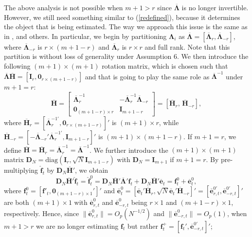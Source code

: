 \documentclass[12pt,fleqn]{article}
\def\*#1{\mathbf{#1}}
\def\+#1{\boldsymbol{#1}}
\begin{document}
The above analysis is not possible when $m +1> r$ since $\overline{\+{\Lambda}}$ is no longer invertible. However, we still need something similar to (\ref{redefined}), because it determines the object that is being estimated. The way we approach this issue is the same as in \citet{juodis2021robustness}, and others. In particular, we begin by partitioning $\+{\Lambda}_i$ as $\overline{\+{\Lambda}}=[\overline{\+{\Lambda}}_r, \overline{\+{\Lambda}}_{-r}]$, where $\overline{\+{\Lambda}}_{-r}$ is $r\times (m+1-r)$ and $\overline{\+{\Lambda}}_r$ is $r \times r$ and full rank. Note that this partition is without loss of generality under Assumption 6. We then introduce the following $(m+1)\times (m+1)$ rotation matrix, which is chosen such that $\overline{\+{\Lambda}}\overline{\*{H}}= [\*{I}_r, \*{0}_{r\times (m+1-r)}]$ and that is going to play the same role as $\overline{\+{\Lambda}}^{-1}$ under $m+1=r$:
\begin{equation}
    \overline{\*{H}} =\left[\begin{array}{cc}\overline{\+{\Lambda}}_r^{-1} & -\overline{\+{\Lambda}}_r^{-1}\overline{\+{\Lambda}}_{-r}\\
    \*{0}_{(m+1-r)\times r} & \*{I}_{m+1-r}\end{array}\right]=[\overline{\*{H}}_r,\, \overline{\*{H}}_{-r}],
\end{equation}
where $\overline{\*{H}}_r=[\overline{\+{\Lambda}}_r^{-1\prime}, \*{0}_{r\times (m+1-r)} ]'$ is $(m+1)\times r$, while $\overline{\*{H}}_{-r}=[ -\overline{\+{\Lambda}}_{-r}'\overline{\+{\Lambda}}_r^{-1\prime}, \*{I}_{m+1-r}]'$ is $(m+1)\times (m+1-r)$. If $m+1=r$, we define $\overline{\*{H}}=\overline{\*{H}}_r=\overline{\+{\Lambda}}_r^{-1}=\overline{\+{\Lambda}}^{-1}$. We further introduce the $(m+1)\times (m+1)$ matrix $\*{D}_N= \mathrm{diag}(\*{I}_r , \sqrt{N}\*{I}_{m+1-r})$ with $\*{D}_N=\*{I}_{m+1}$ if $m+1=r$. By pre-multiplying $\widehat{\*{f}}_t$ by $\*{D}_N\overline{\*{H}}'$, we obtain
\begin{equation}\label{fhat0}
    \*{D}_N\overline{\*{H}}'\widehat{\*{f}}_t=\widehat{\*{f}}^0_t= \*{D}_N\overline{\*{H}}'\overline{\+{\Lambda}}'\*{f}_t+ \*{D}_N\overline{\*{H}}'\overline{\*e}_t=\*{f}^0_t+\overline{\*e}^0_t,
\end{equation}
where $\*{f}^0_t=[\*{f}'_t, \*{0}_{(m+1-r)\times 1}']'$ and $\overline{\*e}^0_t=[\overline{\*e}_{t}'\overline{\*H}_r, \sqrt{N}\overline{\*{e}}_{t}'\overline{\*H}_{-r}]'=
[\overline{\*{e}}^{0\prime}_{r,t}, \overline{\*{e}}^{0\prime}_{-r,t}]'$ are both $(m+1)\times 1$ with $\overline{\*{e}}_{r,t}^0$ and $\overline{\*{e}}_{-r,t}^0$ being $r\times 1$ and $(m+1-r)\times 1$, respectively. Hence, since $\|\overline{\*{e}}_{r,t}^0\| =O_p(N^{-1/2})$ and $\|\overline{\*{e}}_{-r,t}^0\| =O_p(1)$, when $m + 1> r$ we are no longer estimating $\*{f}_t$ but rather $\*f_t^+ = [\*{f}_t', \overline{\*{e}}_{-r,t}^{0\prime}]'$;
\end{document}

